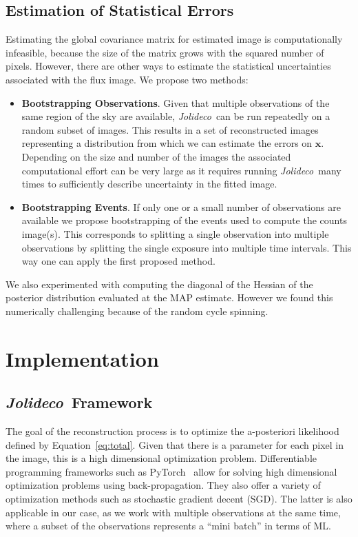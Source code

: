 \documentclass[twocolumn, lineno]{aastex631}
\newcommand{\jolideco}{\textit{Jolideco}~}
\begin{document}
    \subsection{Estimation of Statistical Errors}
    Estimating the global covariance matrix for estimated image is computationally infeasible, because the size of the matrix grows with the squared number of pixels. However, there are other ways to estimate the statistical uncertainties associated with the flux image. We propose two methods:

    \begin{itemize}
    \item \textbf{Bootstrapping Observations}. Given that multiple observations of the same region of the sky are available, \jolideco can be run repeatedly on a random subset of images. This results in a set of reconstructed images representing a distribution from which we can estimate the errors on $\mathbf{x}$. Depending on the size and number of the images the associated computational effort can be very large as it requires running \jolideco many times to sufficiently describe uncertainty in the fitted image.

    \item \textbf{Bootstrapping Events}. If only one or a small number of observations are available we propose bootstrapping of the events used to compute the counts image(s). This corresponds to splitting a single observation into multiple observations by splitting the single exposure into multiple time intervals. This way one can apply the first proposed method.
    \end{itemize}

    We also experimented with computing the diagonal of the Hessian of the posterior distribution evaluated at the MAP estimate. However we found this numerically challenging because of the random cycle spinning. 

    \section{Implementation}
    \subsection{\jolideco Framework}
    The goal of the reconstruction process is to optimize the a-posteriori likelihood defined by Equation~\ref{eq:total}. Given that there is a parameter for each pixel in the image, this is a high dimensional optimization problem. Differentiable programming frameworks such as PyTorch~\citep{Pytorch2019} allow for solving high dimensional optimization problems using back-propagation. They also offer a variety of optimization methods such as stochastic gradient decent (SGD). The latter is also applicable in our case, as we work with multiple observations at the same time, where a subset of the observations represents a \enquote{mini batch} in terms of ML.
\end{document}
